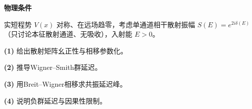 \textbf{物理条件}\par 实短程势 \(V(x)\) 对称、在远场趋零，考虑单通道相干散射振幅 \(S(E)=e^{2i\delta(E)}\)（只讨论本征散射通道、无吸收），入射能 \(E>0\)。
\par\noindent\textbf{(1)} 给出散射矩阵幺正性与相移参数化。
\par\noindent\textbf{(2)} 推导Wigner–Smith群延迟。
\par\noindent\textbf{(3)} 用Breit–Wigner相移求共振延迟峰。
\par\noindent\textbf{(4)} 说明负群延迟与因果性限制。
